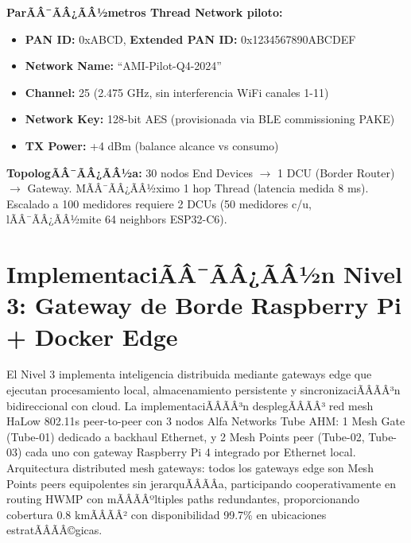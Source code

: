 \textbf{ParÃÂ¯ÃÂ¿ÃÂ½metros Thread Network piloto:}
\begin{itemize}
    \item \textbf{PAN ID:} 0xABCD, \textbf{Extended PAN ID:} 0x1234567890ABCDEF
    \item \textbf{Network Name:} ``AMI-Pilot-Q4-2024''
    \item \textbf{Channel:} 25 (2.475 GHz, sin interferencia WiFi canales 1-11)
    \item \textbf{Network Key:} 128-bit AES (provisionada via BLE commissioning PAKE)
    \item \textbf{TX Power:} +4 dBm (balance alcance vs consumo)
\end{itemize}

\textbf{TopologÃÂ¯ÃÂ¿ÃÂ½a:} 30 nodos End Devices $\rightarrow$ 1 DCU (Border Router) $\rightarrow$ Gateway. MÃÂ¯ÃÂ¿ÃÂ½ximo 1 hop Thread (latencia medida 8 ms). Escalado a 100 medidores requiere 2 DCUs (50 medidores c/u, lÃÂ¯ÃÂ¿ÃÂ½mite 64 neighbors ESP32-C6).

\section{ImplementaciÃÂ¯ÃÂ¿ÃÂ½n Nivel 3: Gateway de Borde Raspberry Pi + Docker Edge}
\label{sec:impl-nivel3-gateway}

El Nivel 3 implementa inteligencia distribuida mediante gateways edge que ejecutan procesamiento local, almacenamiento persistente y sincronizaciÃÂÃÂ³n bidireccional con cloud. La implementaciÃÂÃÂ³n desplegÃÂÃÂ³ red mesh HaLow 802.11s peer-to-peer con 3 nodos Alfa Networks Tube AHM: 1 Mesh Gate (Tube-01) dedicado a backhaul Ethernet, y 2 Mesh Points peer (Tube-02, Tube-03) cada uno con gateway Raspberry Pi 4 integrado por Ethernet local. Arquitectura distributed mesh gateways: todos los gateways edge son Mesh Points peers equipolentes sin jerarquÃÂÃÂ­a, participando cooperativamente en routing HWMP con mÃÂÃÂºltiples paths redundantes, proporcionando cobertura 0.8 kmÃÂÃÂ² con disponibilidad 99.7\% en ubicaciones estratÃÂÃÂ©gicas.

